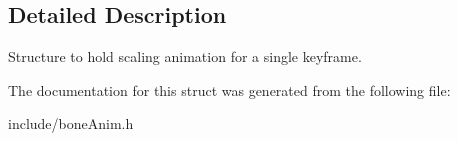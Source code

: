 \subsection{Detailed Description}
Structure to hold scaling animation for a single keyframe. 

The documentation for this struct was generated from the following file\+:\begin{DoxyCompactItemize}
\item 
include/bone\+Anim.\+h\end{DoxyCompactItemize}
